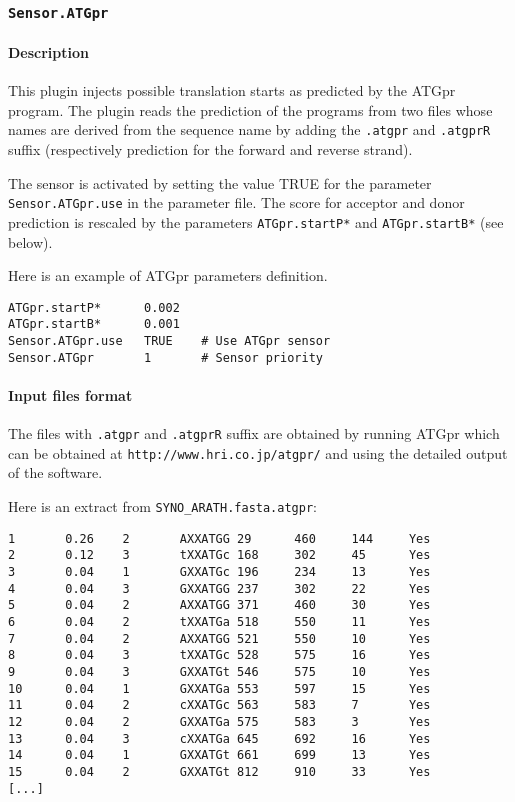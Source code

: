 
\subsubsection{\texttt{Sensor.ATGpr}}

\paragraph{Description}

This plugin injects possible translation starts as predicted by the
ATGpr program. The plugin reads the prediction of the
programs from two files whose names are derived from the sequence name
by adding the \texttt{.atgpr} and \texttt{.atgprR} suffix
(respectively prediction for the forward and reverse strand).

The sensor is activated by setting the value TRUE for the parameter
\texttt{Sensor.ATGpr.use} in the parameter file. The score for acceptor
and donor prediction is rescaled by the parameters {\tt ATGpr.startP*} and
{\tt ATGpr.startB*} (see below).

Here is an example of ATGpr parameters definition.
\begin{Verbatim}[fontsize=\small]
ATGpr.startP*      0.002
ATGpr.startB*      0.001
Sensor.ATGpr.use   TRUE    # Use ATGpr sensor
Sensor.ATGpr       1       # Sensor priority
\end{Verbatim}

\paragraph{Input files format}

The files with \texttt{.atgpr} and \texttt{.atgprR} suffix are
obtained by running ATGpr which can be obtained at
\texttt{http://www.hri.co.jp/atgpr/} and using the
detailed output of the software.

Here is an extract from \texttt{SYNO\_ARATH.fasta.atgpr}:
\begin{Verbatim}[fontsize=\small]
1       0.26    2       AXXATGG 29      460     144     Yes     
2       0.12    3       tXXATGc 168     302     45      Yes     
3       0.04    1       GXXATGc 196     234     13      Yes     
4       0.04    3       GXXATGG 237     302     22      Yes     
5       0.04    2       AXXATGG 371     460     30      Yes     
6       0.04    2       tXXATGa 518     550     11      Yes     
7       0.04    2       AXXATGG 521     550     10      Yes     
8       0.04    3       tXXATGc 528     575     16      Yes     
9       0.04    3       GXXATGt 546     575     10      Yes     
10      0.04    1       GXXATGa 553     597     15      Yes     
11      0.04    2       cXXATGc 563     583     7       Yes     
12      0.04    2       GXXATGa 575     583     3       Yes     
13      0.04    3       cXXATGa 645     692     16      Yes     
14      0.04    1       GXXATGt 661     699     13      Yes     
15      0.04    2       GXXATGt 812     910     33      Yes     
[...]
\end{Verbatim}

